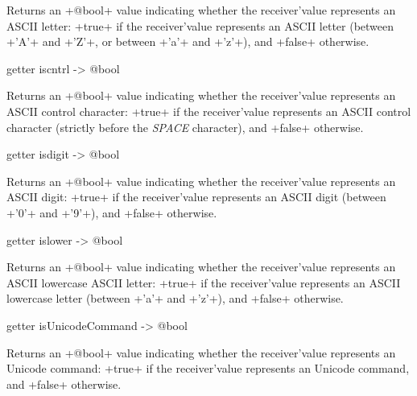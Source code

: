 Returns an \ggst+@bool+ value indicating whether the receiver'value represents an ASCII letter: \ggst+true+ if the receiver'value represents an ASCII letter (between \ggst+'A'+ and \ggst+'Z'+, or between \ggst+'a'+ and \ggst+'z'+), and \ggst+false+ otherwise.





\begin{galgas3}
getter iscntrl -> @bool
\end{galgas3}

Returns an \ggst+@bool+ value indicating whether the receiver'value represents an ASCII control character: \ggst+true+ if the receiver'value represents an ASCII control character (strictly before the \emph{SPACE} character), and \ggst+false+ otherwise.






\begin{galgas3}
getter isdigit -> @bool
\end{galgas3}

Returns an \ggst+@bool+ value indicating whether the receiver'value represents an ASCII digit: \ggst+true+ if the receiver'value represents an ASCII digit (between \ggst+'0'+ and \ggst+'9'+), and \ggst+false+ otherwise.






\begin{galgas3}
getter islower -> @bool
\end{galgas3}

Returns an \ggst+@bool+ value indicating whether the receiver'value represents an ASCII lowercase ASCII letter: \ggst+true+ if the receiver'value represents an ASCII lowercase letter (between \ggst+'a'+ and \ggst+'z'+), and \ggst+false+ otherwise.







\begin{galgas3}
getter isUnicodeCommand -> @bool
\end{galgas3}

Returns an \ggst+@bool+ value indicating whether the receiver'value represents an Unicode command: \ggst+true+ if the receiver'value represents an Unicode command, and \ggst+false+ otherwise.






